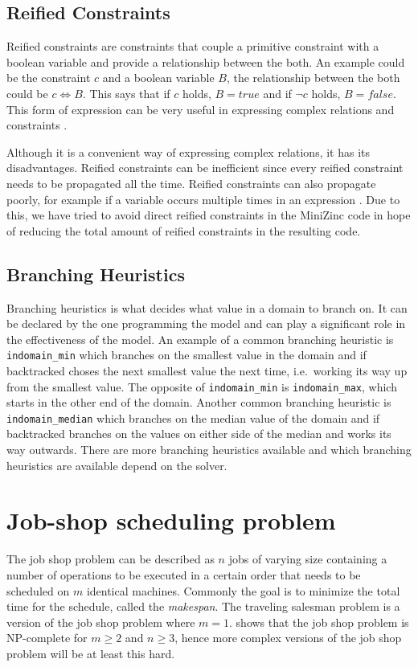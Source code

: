 \cite{tsang_1993}
\cite{marriott_1998}
\cite{mz_manual}

\subsection{Reified Constraints}
Reified constraints are constraints that couple a primitive constraint with a boolean variable and provide a relationship between the both. An example could be the constraint $c$ and a boolean variable $B$, the relationship between the both could be $c \Leftrightarrow B$. This says that if $c$ holds, $B = true$ and if $\neg c$ holds, $B = false$. This form of expression can be very useful in expressing complex relations and constraints \cite{marriott_1998}.

Although it is a convenient way of expressing complex relations, it has its disadvantages. Reified constraints can be inefficient since every reified constraint needs to be propagated all the time. Reified constraints can also propagate poorly, for example if a variable occurs multiple times in an expression \cite{jefferson_2010}. Due to this, we have tried to avoid direct reified constraints in the MiniZinc code in hope of reducing the total amount of reified constraints in the resulting code.

\subsection{Branching Heuristics}
Branching heuristics is what decides what value in a domain to branch on. It can be declared by the one programming the model and can play a significant role in the effectiveness of the model. An example of a common branching heuristic is \texttt{indomain\_min} which branches on the smallest value in the domain and if backtracked choses the next smallest value the next time, i.e.\ working its way up from the smallest value. The opposite of \texttt{indomain\_min} is \texttt{indomain\_max}, which starts in the other end of the domain. Another common branching heuristic is \texttt{indomain\_median} which branches on the median value of the domain and if backtracked branches on the values on either side of the median and works its way outwards. There are more branching heuristics available and which branching heuristics are available depend on the solver.

\section{Job-shop scheduling problem}
The job shop problem can be described as $n$ jobs of varying size containing a number of operations to be executed in a certain order that needs to be scheduled on $m$ identical machines. Commonly the goal is to minimize the total time for the schedule, called the \emph{makespan}. The traveling salesman problem is a version of the job shop problem where $m = 1$. \cite{garey_1976} shows that the job shop problem is NP-complete for $m \geq 2$ and $n \geq 3$, hence more complex versions of the job shop problem will be at least this hard.

